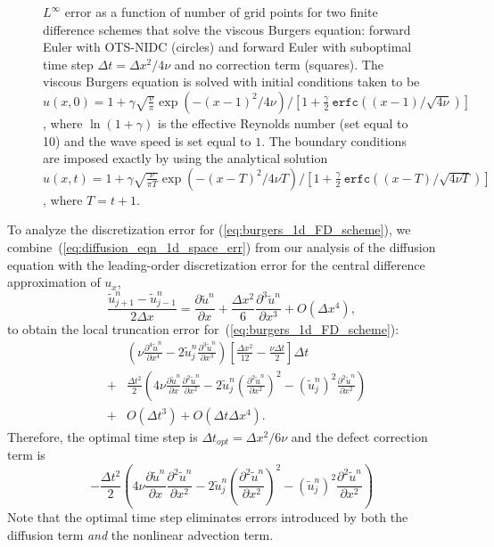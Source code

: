 \documentclass[fleqn,12pt,twoside]{article}
\newcommand{\beq}{\begin{equation}}
\newcommand{\eeq}{\end{equation}}
\newcommand{\bea}{\begin{eqnarray}}
\newcommand{\eea}{\end{eqnarray}}
\def\px{\partial x}
\def\tu{\tilde{u}}
\def\dt{\Delta t}
\def\dx{\Delta x}
\def\dto{\dt_{opt}}
\begin{document}
\begin{figure}[tb]
\begin{center}
\caption{$L^\infty$ error as a function of number of grid points for
two finite difference schemes that solve the viscous Burgers equation:
forward Euler with OTS-NIDC (circles)
and forward Euler with suboptimal time step $\dt = \dx^2/4\nu$ and no 
correction term (squares).
The viscous Burgers equation is solved with initial conditions taken to be 
$u(x,0) = 1 + \gamma \sqrt{\frac{\nu}{\pi}} \exp\left( -(x-1)^2/4 \nu \right) 
            / \left[ 1 + \frac{\gamma}{2} \ 
                         \mathtt{erfc}\left((x-1)/\sqrt{4\nu} \right) 
    \right]$,
where $\ln(1+\gamma)$ is the effective Reynolds number (set equal to 10) and 
the wave speed is set equal to $1$.  The boundary conditions are imposed 
exactly by using
the analytical solution
$u(x,t) = 1 + \gamma \sqrt{\frac{\nu}{\pi T}} 
              \exp\left( -(x-T)^2/4 \nu T \right) 
            / \left[ 1 + \frac{\gamma}{2} \ 
                         \mathtt{erfc}\left((x-T)/\sqrt{4\nu T} \right) 
    \right]$,
where $T = t+1$.
}
\label{fig:burgers_1d_error}
\end{center}
\end{figure}

To analyze the discretization error for (\ref{eq:burgers_1d_FD_scheme}), 
we combine~(\ref{eq:diffusion_eqn_1d_space_err}) from our analysis of 
the diffusion equation with the leading-order discretization error for 
the central difference approximation of $u_x$,
\beq
  \frac{\tu^{n}_{j+1} - \tu^{n}_{j-1}}{2 \dx}  =
  \frac{\partial \tu^n}{\px} 
  + \frac{\dx^2}{6} \frac{\partial^3 \tu^n}{\px^3} 
  + O(\dx^4),
  \label{eq:burgers_1d_ux_err}
\eeq
to obtain the local truncation error for~(\ref{eq:burgers_1d_FD_scheme}): 
\bea
  & &
      \left( \nu \frac{\partial^4 \tu^n}{\px^4} 
           - 2 \tu^n_j \frac{\partial^3 \tu^n}{\px^3} \right)
      \left[ \frac{\dx^2}{12} - \frac{\nu \dt}{2}  \right] \dt
  \nonumber \\
  &+& \frac{\dt^2}{2} 
      \left( 
           4 \nu \frac{\partial \tu^n}{\px} \frac{\partial^2 \tu^n}{\px^2}
         - 2 \tu^n_j \left( \frac{\partial^2 \tu^n}{\px^2} \right)^2
         - \left(\tu^n_j\right)^2 \frac{\partial^2 \tu^n}{\px^2}
      \right) 
  \nonumber \\
  &+& O(\dt^3) + O(\dt \dx^4).
  \label{eq:burgers_1d_err_eqn}
\eea
Therefore, the optimal time step is $\dto = \dx^2/6\nu$ and the defect 
correction term is
\beq
  - \frac{\dt^2}{2} 
      \left( 
           4 \nu \frac{\partial \tu^n}{\px} \frac{\partial^2 \tu^n}{\px^2}
         - 2 \tu^n_j \left( \frac{\partial^2 \tu^n}{\px^2} \right)^2
         - \left(\tu^n_j\right)^2 \frac{\partial^2 \tu^n}{\px^2}
      \right)
  \label{eq:burgers_1d_corr_term}
\eeq 
Note that the optimal time step eliminates errors introduced by 
both the diffusion term \emph{and} the nonlinear advection term.
\end{document}
